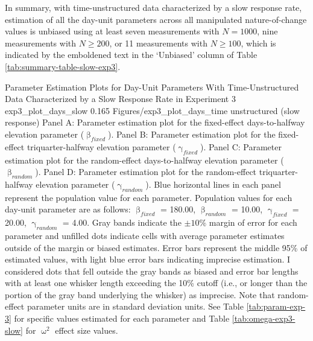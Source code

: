 \documentclass[
12pt, %
twoside,
english]{guelphthesis}
\begin{document}
In summary, with time-unstructured data characterized by a slow response rate, estimation of all the day-unit parameters across all manipulated nature-of-change values is unbiased using at least seven measurements with \(N = 1000\), nine measurements with \(N \ge 200\), or 11 measurements with \(N \ge 100\), which is indicated by the emboldened text in the `Unbiased' column of Table \ref{tab:summary-table-slow-exp3}.
\begin{apaFigure}
[portrait]
[samepage]
[-0.2cm]
{Parameter Estimation Plots for Day-Unit Parameters With Time-Unstructured Data Characterized by a Slow Response Rate in Experiment 3}
{exp3_plot_days_slow}
{0.165}
{Figures/exp3_plot_days_time unstructured (slow response)}
{Panel A: Parameter estimation plot for the fixed-effect days-to-halfway elevation parameter ($\upbeta_{fixed}$). Panel B: Parameter estimation plot for the fixed-effect triquarter-halfway elevation parameter ($\upgamma_{fixed}$). Panel C: Parameter estimation plot for the random-effect days-to-halfway elevation parameter ($\upbeta_{random}$). Panel D: Parameter estimation plot for the random-effect triquarter-halfway elevation parameter ($\upgamma_{random}$). Blue horizontal lines in each panel represent the population value for each parameter. Population values for each day-unit parameter are as follows: $\upbeta_{fixed}$ = 180.00, $\upbeta_{random}$ = 10.00, $\upgamma_{fixed}$ = 20.00, $\upgamma_{random}$ = 4.00. Gray bands indicate the $\pm 10\%$ margin of error for each parameter and unfilled dots indicate cells with average parameter estimates outside of the margin or biased estimates. Error bars represent the middle 95\% of estimated values, with light blue error bars indicating imprecise estimation. I considered dots that fell outside the gray bands as biased and error bar lengths with at least one whisker length exceeding the 10\% cutoff (i.e., or longer than the portion of the gray band underlying the whisker) as imprecise. Note that random-effect parameter units are in standard deviation units. See Table \ref{tab:param-exp-3} for specific values estimated for each parameter and Table \ref{tab:omega-exp3-slow} for $\upomega^2$ effect size values.}
\end{apaFigure}
\end{document}
